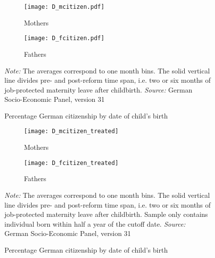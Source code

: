 \documentclass[a4paper ]{article}
\begin{document}
\newpage
\vspace*{\fill}
\begin{figure}[h]
	\centering
	\begin{subfigure}[h]{0.48\textwidth}
		\centering
		\texttt{[image: D\_mcitizen.pdf]}
		\caption{Mothers}		
	\end{subfigure}
	\quad
	\begin{subfigure}[h]{0.48\textwidth}
		\centering
		\texttt{[image: D\_fcitizen.pdf]}
		\caption{Fathers}
	\end{subfigure}
	\caption{Percentage German citizenship by date of child's birth}\label{fig:citizen_all cohorts}
	\begin{minipage}{\textwidth} %
{\footnotesize \textit{Note:} The averages correspond to one month bins. The solid vertical line divides pre- and post-reform time span, i.e. two or six months of job-protected maternity leave after childbirth. \newline \textit{Source: }German Socio-Economic Panel, version 31\par}
\end{minipage}
\end{figure}

\begin{figure}[h]
	\centering
	\begin{subfigure}[h]{0.48\textwidth}
		\centering
		\texttt{[image: D\_mcitizen\_treated]}
		\caption{Mothers}		
	\end{subfigure}
	\quad
	\begin{subfigure}[h]{0.48\textwidth}
		\centering
		\texttt{[image: D\_fcitizen\_treated]}
		\caption{Fathers}
	\end{subfigure}
	\caption{Percentage German citizenship by date of child's birth}\label{fig:citizen_treatment cohort}
	\begin{minipage}{\textwidth} %
{\footnotesize \textit{Note:} The averages correspond to one month bins. The solid vertical line divides pre- and post-reform time span, i.e. two or six months of job-protected maternity leave after childbirth. Sample only contains individual born within half a year of the cutoff date. \newline \textit{Source: }German Socio-Economic Panel, version 31\par}
\end{minipage}
\end{figure}
\vspace*{\fill}
\end{document}
